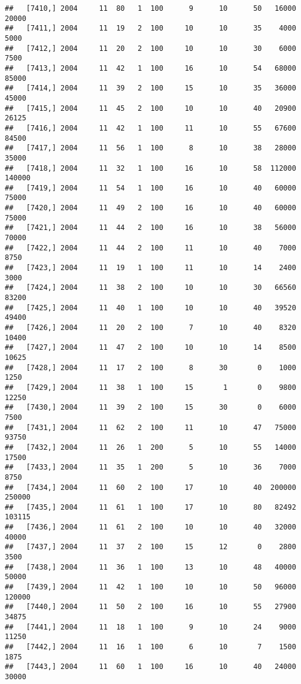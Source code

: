 \documentclass{article}\usepackage[]{graphicx}\usepackage[]{color}
\makeatletter
\newenvironment{kframe}{%
 \def\at@end@of@kframe{}%
 \ifinner\ifhmode%
  \def\at@end@of@kframe{\end{minipage}}%
  \begin{minipage}{\columnwidth}%
 \fi\fi%
 \def\FrameCommand##1{\hskip\@totalleftmargin \hskip-\fboxsep
 \colorbox{shadecolor}{##1}\hskip-\fboxsep
     \hskip-\linewidth \hskip-\@totalleftmargin \hskip\columnwidth}%
 \MakeFramed {\advance\hsize-\width
   \@totalleftmargin\z@ \linewidth\hsize
   \@setminipage}}%
 {\par\unskip\endMakeFramed%
 \at@end@of@kframe}
\newenvironment{knitrout}{}{} %
\makeatother
\begin{document}
\begin{knitrout}
\begin{kframe}
\begin{verbatim}
##   [7410,] 2004     11  80   1  100      9      10      50   16000   20000
##   [7411,] 2004     11  19   2  100     10      10      35    4000    5000
##   [7412,] 2004     11  20   2  100     10      10      30    6000    7500
##   [7413,] 2004     11  42   1  100     16      10      54   68000   85000
##   [7414,] 2004     11  39   2  100     15      10      35   36000   45000
##   [7415,] 2004     11  45   2  100     10      10      40   20900   26125
##   [7416,] 2004     11  42   1  100     11      10      55   67600   84500
##   [7417,] 2004     11  56   1  100      8      10      38   28000   35000
##   [7418,] 2004     11  32   1  100     16      10      58  112000  140000
##   [7419,] 2004     11  54   1  100     16      10      40   60000   75000
##   [7420,] 2004     11  49   2  100     16      10      40   60000   75000
##   [7421,] 2004     11  44   2  100     16      10      38   56000   70000
##   [7422,] 2004     11  44   2  100     11      10      40    7000    8750
##   [7423,] 2004     11  19   1  100     11      10      14    2400    3000
##   [7424,] 2004     11  38   2  100     10      10      30   66560   83200
##   [7425,] 2004     11  40   1  100     10      10      40   39520   49400
##   [7426,] 2004     11  20   2  100      7      10      40    8320   10400
##   [7427,] 2004     11  47   2  100     10      10      14    8500   10625
##   [7428,] 2004     11  17   2  100      8      30       0    1000    1250
##   [7429,] 2004     11  38   1  100     15       1       0    9800   12250
##   [7430,] 2004     11  39   2  100     15      30       0    6000    7500
##   [7431,] 2004     11  62   2  100     11      10      47   75000   93750
##   [7432,] 2004     11  26   1  200      5      10      55   14000   17500
##   [7433,] 2004     11  35   1  200      5      10      36    7000    8750
##   [7434,] 2004     11  60   2  100     17      10      40  200000  250000
##   [7435,] 2004     11  61   1  100     17      10      80   82492  103115
##   [7436,] 2004     11  61   2  100     10      10      40   32000   40000
##   [7437,] 2004     11  37   2  100     15      12       0    2800    3500
##   [7438,] 2004     11  36   1  100     13      10      48   40000   50000
##   [7439,] 2004     11  42   1  100     10      10      50   96000  120000
##   [7440,] 2004     11  50   2  100     16      10      55   27900   34875
##   [7441,] 2004     11  18   1  100      9      10      24    9000   11250
##   [7442,] 2004     11  16   1  100      6      10       7    1500    1875
##   [7443,] 2004     11  60   1  100     16      10      40   24000   30000

\end{verbatim}
\end{kframe}
\end{knitrout}
\end{document}
